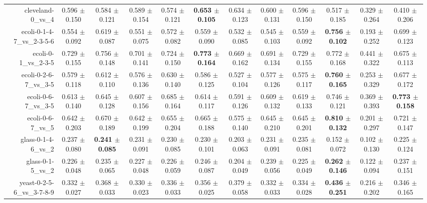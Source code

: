 \begin{table}[!ht]
{\begin{tabular}{r c c c c c c c c c c c}
cleveland-0\_vs\_4 & 0.596 $\pm$ 0.150 & 0.584 $\pm$ 0.121 & 0.589 $\pm$ 0.154 & 0.574 $\pm$ 0.121 & \textbf{0.653 $\pm$ 0.105} & 0.634 $\pm$ 0.123 & 0.600 $\pm$ 0.131 & 0.596 $\pm$ 0.150 & 0.517 $\pm$ 0.185 & 0.329 $\pm$ 0.264 & 0.410 $\pm$ 0.206 \\
ecoli-0-1-4-7\_vs\_2-3-5-6 & 0.554 $\pm$ 0.092 & 0.619 $\pm$ 0.087 & 0.551 $\pm$ 0.075 & 0.572 $\pm$ 0.082 & 0.559 $\pm$ 0.090 & 0.532 $\pm$ 0.085 & 0.545 $\pm$ 0.103 & 0.559 $\pm$ 0.092 & \textbf{0.756 $\pm$ 0.102} & 0.193 $\pm$ 0.252 & 0.699 $\pm$ 0.123 \\
ecoli-0-1\_vs\_2-3-5 & 0.729 $\pm$ 0.155 & 0.756 $\pm$ 0.148 & 0.701 $\pm$ 0.141 & 0.724 $\pm$ 0.150 & \textbf{0.773 $\pm$ 0.164} & 0.669 $\pm$ 0.162 & 0.691 $\pm$ 0.134 & 0.729 $\pm$ 0.155 & 0.772 $\pm$ 0.168 & 0.441 $\pm$ 0.322 & 0.675 $\pm$ 0.113 \\
ecoli-0-2-6-7\_vs\_3-5 & 0.579 $\pm$ 0.118 & 0.612 $\pm$ 0.110 & 0.576 $\pm$ 0.136 & 0.630 $\pm$ 0.140 & 0.586 $\pm$ 0.125 & 0.527 $\pm$ 0.104 & 0.577 $\pm$ 0.126 & 0.575 $\pm$ 0.117 & \textbf{0.760 $\pm$ 0.165} & 0.253 $\pm$ 0.329 & 0.677 $\pm$ 0.172 \\
ecoli-0-6-7\_vs\_3-5 & 0.613 $\pm$ 0.140 & 0.645 $\pm$ 0.128 & 0.607 $\pm$ 0.156 & 0.685 $\pm$ 0.164 & 0.614 $\pm$ 0.117 & 0.591 $\pm$ 0.126 & 0.609 $\pm$ 0.132 & 0.619 $\pm$ 0.133 & 0.746 $\pm$ 0.121 & 0.369 $\pm$ 0.393 & \textbf{0.773 $\pm$ 0.158} \\
ecoli-0-6-7\_vs\_5 & 0.642 $\pm$ 0.203 & 0.670 $\pm$ 0.189 & 0.642 $\pm$ 0.199 & 0.655 $\pm$ 0.204 & 0.665 $\pm$ 0.188 & 0.575 $\pm$ 0.140 & 0.645 $\pm$ 0.210 & 0.645 $\pm$ 0.201 & \textbf{0.810 $\pm$ 0.132} & 0.201 $\pm$ 0.297 & 0.721 $\pm$ 0.147 \\
glass-0-1-4-6\_vs\_2 & 0.237 $\pm$ 0.080 & \textbf{0.241 $\pm$ 0.085} & 0.231 $\pm$ 0.091 & 0.230 $\pm$ 0.085 & 0.230 $\pm$ 0.101 & 0.203 $\pm$ 0.063 & 0.231 $\pm$ 0.091 & 0.235 $\pm$ 0.081 & 0.152 $\pm$ 0.072 & 0.102 $\pm$ 0.130 & 0.225 $\pm$ 0.124 \\
glass-0-1-5\_vs\_2 & 0.226 $\pm$ 0.048 & 0.235 $\pm$ 0.065 & 0.227 $\pm$ 0.048 & 0.226 $\pm$ 0.059 & 0.246 $\pm$ 0.087 & 0.204 $\pm$ 0.049 & 0.239 $\pm$ 0.056 & 0.225 $\pm$ 0.049 & \textbf{0.262 $\pm$ 0.146} & 0.122 $\pm$ 0.094 & 0.237 $\pm$ 0.151 \\
yeast-0-2-5-6\_vs\_3-7-8-9 & 0.332 $\pm$ 0.027 & 0.368 $\pm$ 0.033 & 0.330 $\pm$ 0.023 & 0.336 $\pm$ 0.033 & 0.356 $\pm$ 0.025 & 0.379 $\pm$ 0.058 & 0.332 $\pm$ 0.033 & 0.334 $\pm$ 0.028 & \textbf{0.436 $\pm$ 0.251} & 0.216 $\pm$ 0.202 & 0.346 $\pm$ 0.165 \\

\end{tabular}}
\end{table}
